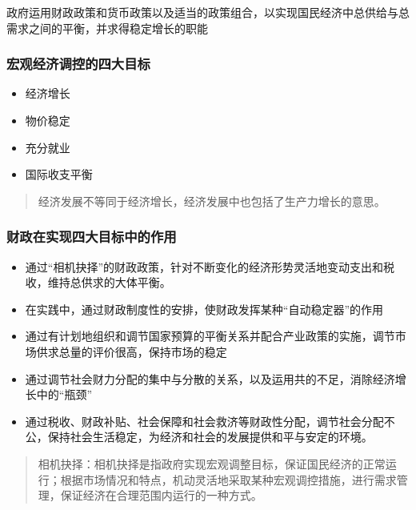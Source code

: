 \documentclass[
]{book}
\providecommand{\tightlist}{%
  \setlength{\itemsep}{0pt}\setlength{\parskip}{0pt}}
\begin{document}
政府运用财政政策和货币政策以及适当的政策组合，以实现国民经济中总供给与总需求之间的平衡，并求得稳定增长的职能

\hypertarget{ux5b8fux89c2ux7ecfux6d4eux8c03ux63a7ux7684ux56dbux5927ux76eeux6807}{%
\subsubsection{宏观经济调控的四大目标}\label{ux5b8fux89c2ux7ecfux6d4eux8c03ux63a7ux7684ux56dbux5927ux76eeux6807}}

\begin{itemize}
\tightlist
\item
  经济增长
\item
  物价稳定
\item
  充分就业
\item
  国际收支平衡
\end{itemize}

\begin{quote}
经济发展不等同于经济增长，经济发展中也包括了生产力增长的意思。
\end{quote}

\hypertarget{ux8d22ux653fux5728ux5b9eux73b0ux56dbux5927ux76eeux6807ux4e2dux7684ux4f5cux7528}{%
\subsubsection{财政在实现四大目标中的作用}\label{ux8d22ux653fux5728ux5b9eux73b0ux56dbux5927ux76eeux6807ux4e2dux7684ux4f5cux7528}}

\begin{itemize}
\tightlist
\item
  通过``相机抉择''的财政政策，针对不断变化的经济形势灵活地变动支出和税收，维持总供求的大体平衡。
\item
  在实践中，通过财政制度性的安排，使财政发挥某种``自动稳定器''的作用
\item
  通过有计划地组织和调节国家预算的平衡关系并配合产业政策的实施，调节市场供求总量的评价很高，保持市场的稳定
\item
  通过调节社会财力分配的集中与分散的关系，以及运用共的不足，消除经济增长中的``瓶颈''
\item
  通过税收、财政补贴、社会保障和社会救济等财政性分配，调节社会分配不公，保持社会生活稳定，为经济和社会的发展提供和平与安定的环境。
\end{itemize}

\begin{quote}
相机抉择：相机抉择是指政府实现宏观调整目标，保证国民经济的正常运行；根据市场情况和特点，机动灵活地采取某种宏观调控措施，进行需求管理，保证经济在合理范围内运行的一种方式。
\end{quote}
\end{document}
